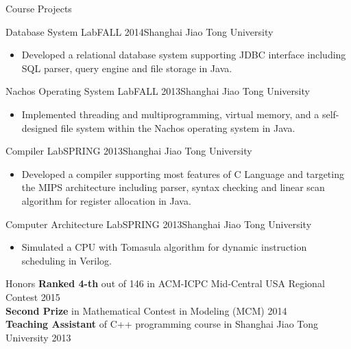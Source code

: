 \documentclass{resume} %
\begin{document}
\begin{rSection}{Course Projects}%

\begin{rSubsection}{Database System Lab}{FALL 2014}{Shanghai Jiao Tong University}
\begin{itemize}
\item Developed a relational database system supporting JDBC interface including SQL parser, query engine and file storage in Java.
\end{itemize}
\end{rSubsection}
\vspace{3pt}
\begin{rSubsection}{Nachos Operating System Lab}{FALL 2013}{Shanghai Jiao Tong University}
\begin{itemize}
\item Implemented threading and multiprogramming, virtual memory, and a self-designed file system within the Nachos operating system in Java.
\end{itemize}
\end{rSubsection}
\vspace{3pt}
\begin{rSubsection}{Compiler Lab}{SPRING 2013}{Shanghai Jiao Tong University}
\begin{itemize}
\item Developed a compiler supporting most features of C Language and targeting the MIPS architecture including parser, syntax checking and linear scan algorithm for register allocation in Java.
\end{itemize}
\end{rSubsection}
\vspace{3pt}
\begin{rSubsection}{Computer Architecture Lab}{SPRING 2013}{Shanghai Jiao Tong University}
\begin{itemize}
\item Simulated a CPU with Tomasula algorithm for dynamic instruction scheduling in Verilog.
\end{itemize}
\end{rSubsection}

\end{rSection}


\begin{rSection}{Honors}
\textbf{Ranked 4-th} out of 146 in ACM-ICPC Mid-Central USA Regional Contest \hfill 2015\\
\textbf{Second Prize} in Mathematical Contest in Modeling (MCM) \hfill 2014\\
\textbf{Teaching Assistant} of C++ programming course in Shanghai Jiao Tong University \hfill 2013\\
\end{rSection}

\end{document}
